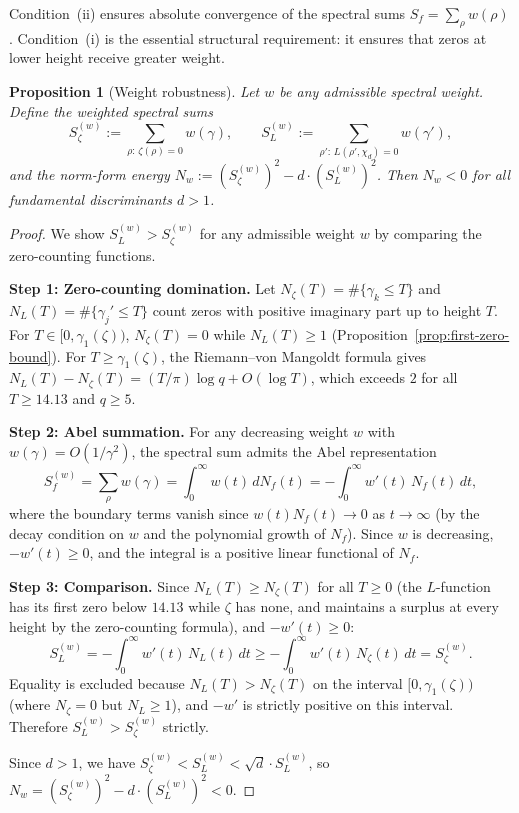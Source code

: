 \documentclass[12pt,reqno]{amsart}
\theoremstyle{plain}
\newtheorem{proposition}[theorem]{Proposition}
\theoremstyle{definition}
\theoremstyle{remark}
\begin{document}
Condition~(ii) ensures absolute convergence of the spectral sums $S_f = \sum_\rho w(\rho)$. Condition~(i) is the essential structural requirement: it ensures that zeros at lower height receive greater weight.

\begin{proposition}[Weight robustness]\label{prop:weight-robustness}
Let $w$ be any admissible spectral weight. Define the weighted spectral sums
\[
S_\zeta^{(w)} := \sum_{\rho:\,\zeta(\rho)=0} w(\gamma), \qquad S_L^{(w)} := \sum_{\rho':\,L(\rho',\chi_d)=0} w(\gamma'),
\]
and the norm-form energy $N_w := (S_\zeta^{(w)})^2 - d \cdot (S_L^{(w)})^2$. Then $N_w < 0$ for all fundamental discriminants $d > 1$.
\end{proposition}

\begin{proof}
We show $S_L^{(w)} > S_\zeta^{(w)}$ for any admissible weight $w$ by comparing the zero-counting functions.

\medskip\noindent\textbf{Step 1: Zero-counting domination.}
Let $N_\zeta(T) = \#\{\gamma_k \leq T\}$ and $N_L(T) = \#\{\gamma_j' \leq T\}$ count zeros with positive imaginary part up to height $T$.  For $T \in [0, \gamma_1(\zeta))$, $N_\zeta(T) = 0$ while $N_L(T) \geq 1$ (Proposition~\ref{prop:first-zero-bound}).  For $T \geq \gamma_1(\zeta)$, the Riemann--von Mangoldt formula gives $N_L(T) - N_\zeta(T) = (T/\pi)\log q + O(\log T)$, which exceeds $2$ for all $T \geq 14.13$ and $q \geq 5$.

\medskip\noindent\textbf{Step 2: Abel summation.}
For any decreasing weight $w$ with $w(\gamma) = O(1/\gamma^2)$, the spectral sum admits the Abel representation
\[
  S_f^{(w)} = \sum_\rho w(\gamma) = \int_0^\infty w(t)\, dN_f(t) = -\int_0^\infty w'(t)\, N_f(t)\, dt,
\]
where the boundary terms vanish since $w(t) N_f(t) \to 0$ as $t \to \infty$ (by the decay condition on $w$ and the polynomial growth of $N_f$).  Since $w$ is decreasing, $-w'(t) \geq 0$, and the integral is a positive linear functional of $N_f$.

\medskip\noindent\textbf{Step 3: Comparison.}
Since $N_L(T) \geq N_\zeta(T)$ for all $T \geq 0$ (the $L$-function has its first zero below $14.13$ while $\zeta$ has none, and maintains a surplus at every height by the zero-counting formula), and $-w'(t) \geq 0$:
\[
  S_L^{(w)} = -\int_0^\infty w'(t)\, N_L(t)\, dt \geq -\int_0^\infty w'(t)\, N_\zeta(t)\, dt = S_\zeta^{(w)}.
\]
Equality is excluded because $N_L(T) > N_\zeta(T)$ on the interval $[0, \gamma_1(\zeta))$ (where $N_\zeta = 0$ but $N_L \geq 1$), and $-w'$ is strictly positive on this interval.  Therefore $S_L^{(w)} > S_\zeta^{(w)}$ strictly.

Since $d > 1$, we have $S_\zeta^{(w)} < S_L^{(w)} < \sqrt{d} \cdot S_L^{(w)}$, so $N_w = (S_\zeta^{(w)})^2 - d \cdot (S_L^{(w)})^2 < 0$.
\end{proof}
\end{document}
